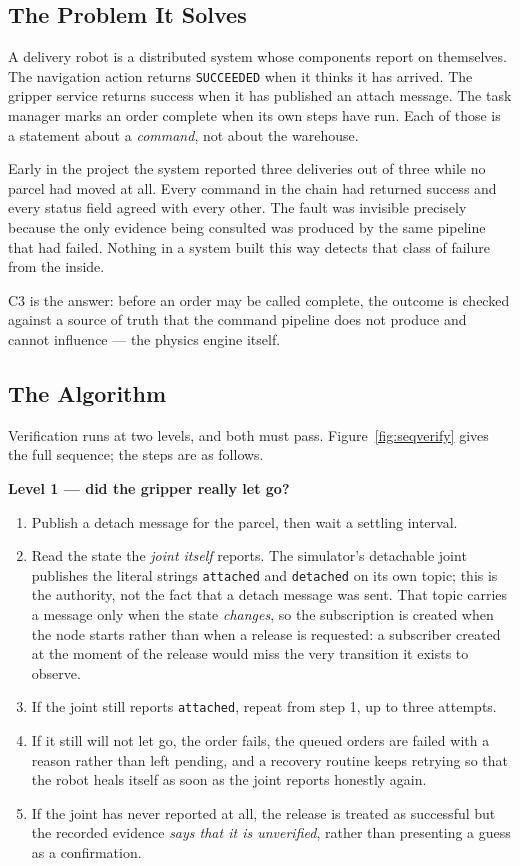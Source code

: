 \documentclass[12pt,a4paper]{report}
\begin{document}
\subsection{The Problem It Solves}
A delivery robot is a distributed system whose components report on themselves. The navigation
action returns \texttt{SUCCEEDED} when it thinks it has arrived. The gripper service returns success
when it has published an attach message. The task manager marks an order complete when its own
steps have run. Each of those is a statement about a \emph{command}, not about the warehouse.

Early in the project the system reported three deliveries out of three while no parcel had moved at
all. Every command in the chain had returned success and every status field agreed with every
other. The fault was invisible precisely because the only evidence being consulted was produced by
the same pipeline that had failed. Nothing in a system built this way detects that class of failure
from the inside.

C3 is the answer: before an order may be called complete, the outcome is checked against a source
of truth that the command pipeline does not produce and cannot influence --- the physics engine
itself.

\subsection{The Algorithm}
Verification runs at two levels, and both must pass. Figure~\ref{fig:seqverify} gives the full
sequence; the steps are as follows.

\textbf{Level 1 --- did the gripper really let go?}
\begin{enumerate}[nosep]
  \item Publish a detach message for the parcel, then wait a settling interval.
  \item Read the state the \emph{joint itself} reports. The simulator's detachable joint publishes
        the literal strings \texttt{attached} and \texttt{detached} on its own topic; this is the
        authority, not the fact that a detach message was sent. That topic carries a message only
        when the state \emph{changes}, so the subscription is created when the node starts rather
        than when a release is requested: a subscriber created at the moment of the release would
        miss the very transition it exists to observe.
  \item If the joint still reports \texttt{attached}, repeat from step 1, up to three attempts.
  \item If it still will not let go, the order fails, the queued orders are failed with a reason
        rather than left pending, and a recovery routine keeps retrying so that the robot heals
        itself as soon as the joint reports honestly again.
  \item If the joint has never reported at all, the release is treated as successful but the
        recorded evidence \emph{says that it is unverified}, rather than presenting a guess as a
        confirmation.
\end{enumerate}
\end{document}
